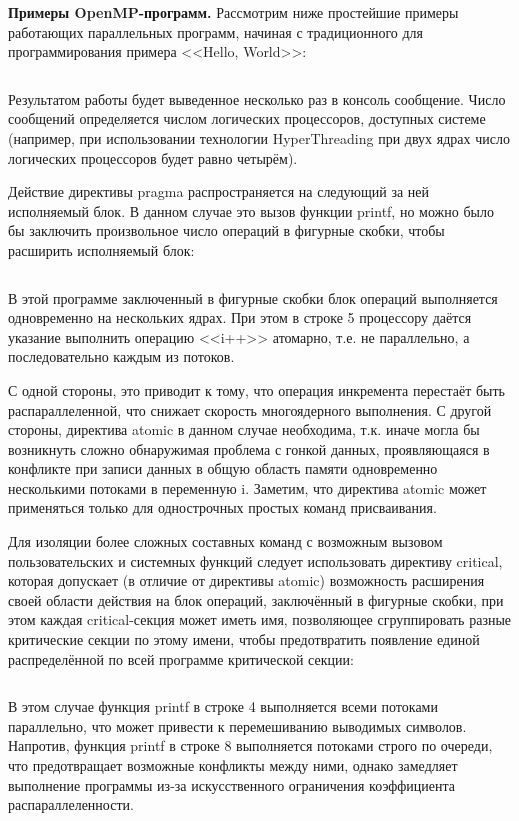 \textbf{Примеры OpenMP-программ.} Рассмотрим ниже простейшие примеры работающих параллельных программ, начиная с традиционного для программирования примера <<Hello, World>>:
\inputminted{c++}{listings/OpenMPExample1.cpp}

Результатом работы будет выведенное несколько раз в консоль сообщение. Число сообщений определяется числом логических процессоров, доступных системе (например, при использовании технологии HyperThreading при двух ядрах число логических процессоров будет равно четырём). 

Действие директивы pragma распространяется на следующий за ней исполняемый блок. В данном случае это вызов функции printf, но можно было бы заключить произвольное число операций в фигурные скобки, чтобы расширить исполняемый блок:
\inputminted{c++}{listings/OpenMPExample2.cpp}

В этой программе заключенный в фигурные скобки блок операций выполняется одновременно на нескольких ядрах. При этом в строке 5 процессору даётся указание выполнить операцию <<i++>> атомарно, т.е. не параллельно, а последовательно каждым из потоков. 

С одной стороны, это приводит к тому, что операция инкремента перестаёт быть распараллеленной, что снижает скорость многоядерного выполнения. С другой стороны, директива atomic в данном случае необходима, т.к. иначе могла бы возникнуть сложно обнаружимая проблема с гонкой данных, проявляющаяся в конфликте при записи данных в общую область памяти одновременно несколькими потоками в переменную i. Заметим, что директива atomic может применяться только для однострочных простых команд присваивания. 

Для изоляции более сложных составных команд с возможным вызовом пользовательских и системных функций следует использовать директиву critical, которая допускает (в отличие от директивы atomic) возможность расширения своей области действия на блок операций, заключённый в фигурные скобки, при этом каждая critical-секция может иметь имя, позволяющее сгруппировать разные критические секции по этому имени, чтобы предотвратить появление единой распределённой по всей программе критической секции:
\inputminted{c++}{listings/OpenMPExample3.cpp}

В этом случае функция printf в строке 4 выполняется всеми потоками параллельно, что может привести к перемешиванию выводимых символов. Напротив, функция printf в строке 8 выполняется потоками строго по очереди, что предотвращает возможные конфликты между ними, однако замедляет выполнение программы из-за искусственного ограничения коэффициента распараллеленности.

